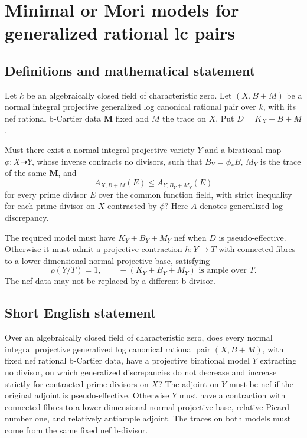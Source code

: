 \documentclass[11pt]{article}
\begin{document}
\section*{Minimal or Mori models for generalized rational lc pairs}\label{30007029}
\subsection{Definitions and mathematical statement}
Let \(k\) be an algebraically closed field of characteristic zero. Let \((X,B+M)\) be a normal integral projective generalized log canonical rational pair over \(k\), with its nef rational b-Cartier data \(\mathbf M\) fixed and \(M\) the trace on \(X\). Put \(D=K_X+B+M\).

Must there exist a normal integral projective variety \(Y\) and a birational map \(\phi:X\dashrightarrow Y\), whose inverse contracts no divisors, such that \(B_Y=\phi_*B\), \(M_Y\) is the trace of the same \(\mathbf M\), and
\[
 A_{X,B+M}(E)\le A_{Y,B_Y+M_Y}(E)
\]
for every prime divisor \(E\) over the common function field, with strict inequality for each prime divisor on \(X\) contracted by \(\phi\)? Here \(A\) denotes generalized log discrepancy.

The required model must have \(K_Y+B_Y+M_Y\) nef when \(D\) is pseudo-effective. Otherwise it must admit a projective contraction \(h:Y\to T\) with connected fibres to a lower-dimensional normal projective base, satisfying
\[
 \rho(Y/T)=1,
 \qquad -(K_Y+B_Y+M_Y)\text{ is ample over }T.
\]
The nef data may not be replaced by a different b-divisor.
\subsection{Short English statement}
Over an algebraically closed field of characteristic zero, does every normal integral projective generalized log canonical rational pair \((X,B+M)\), with fixed nef rational b-Cartier data, have a projective birational model \(Y\) extracting no divisor, on which generalized discrepancies do not decrease and increase strictly for contracted prime divisors on \(X\)? The adjoint on \(Y\) must be nef if the original adjoint is pseudo-effective. Otherwise \(Y\) must have a contraction with connected fibres to a lower-dimensional normal projective base, relative Picard number one, and relatively antiample adjoint. The traces on both models must come from the same fixed nef b-divisor.
\end{document}
